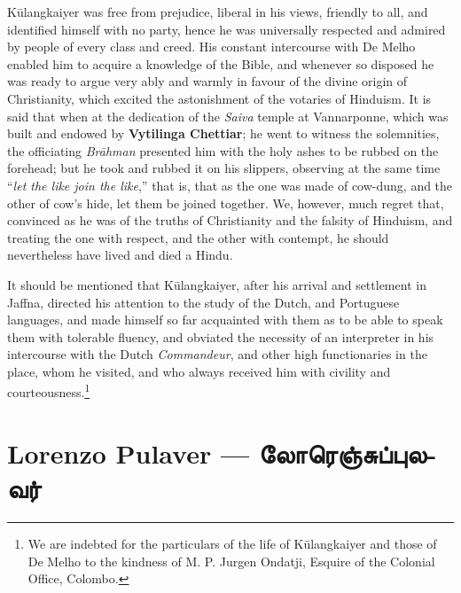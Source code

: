 \documentclass{article}
\newcommand{\TamilBold}[1]{\texttamil{\textbf{#1}}}
\newcommand{\tambold}[1]{\TamilBold{#1}}
\begin{document}
K\={u}langkaiyer was free from prejudice, liberal in his views, friendly to all, and identified himself with no party, hence he was universally respected and admired by people of every class and creed. His constant intercourse with De Melho enabled him to acquire a knowledge of the Bible, and whenever so disposed he was ready to argue very ably and warmly in favour of the divine origin of Christianity, which excited the astonishment of the votaries of Hinduism. It is said that when at the dedication of the \emph{Saiva} temple at Vannarponne, which was built and endowed by \textbf{Vytilinga Chettiar}; he went to witness the solemnities, the officiating \emph{Br\={a}hman} presented him with the holy ashes to be rubbed on the forehead; but he took and rubbed it on his slippers, observing at the same time ``\emph{let the like join the like},'' that is, that as the one was made of cow-dung, and the other of cow's hide, let them be joined together. We, however, much regret that, convinced as he was of the truths of Christianity and the falsity of Hinduism, and treating the one with respect, and the other with contempt, he should nevertheless have lived and died a Hindu.

It should be mentioned that K\={u}langkaiyer, after his arrival and settlement in Jaffna, directed his attention to the study of the Dutch, and Portuguese languages, and made himself so far acquainted with them as to be able to speak them with tolerable fluency, and obviated the necessity of an interpreter in his intercourse with the Dutch \emph{Commandeur}, and other high functionaries in the place, whom he visited, and who always received him with civility and courteousness.\footnote{We are indebted for the particulars of the life of K\={u}langkaiyer and those of De Melho to the kindness of M. P. Jurgen Ondatji, Esquire of the Colonial Office, Colombo.}

\section{Lorenzo Pulaver --- \tambold{லோரெஞ்சுப்புலவர்}}
\end{document}
